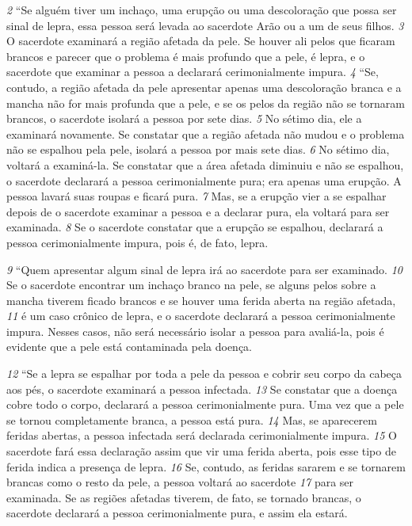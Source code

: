 \smallskip
\textit{\tiny 2} 
“Se alguém tiver um inchaço, uma
erupção ou uma descoloração que possa ser sinal de lepra,
 essa pessoa será
levada ao sacerdote Arão ou a um de seus filhos. 
\textit{\tiny 3} 
O sacerdote examinará a região
afetada da pele. Se houver ali pelos que ficaram brancos e parecer que o
problema é mais profundo que a pele, é lepra, e o sacerdote que examinar a
pessoa a declarará cerimonialmente impura. 
\textit{\tiny 4} 
“Se, contudo, a região afetada da pele apresentar apenas uma descoloração
branca e a mancha não for mais profunda que a pele, e se os pelos da região não
se tornaram brancos, o sacerdote isolará a pessoa por sete dias. 
\textit{\tiny 5} 
No sétimo dia,
ele a examinará novamente. Se constatar que a região afetada não mudou e o
problema não se espalhou pela pele, isolará a pessoa por mais sete dias. 
\textit{\tiny 6} 
No sétimo dia, voltará a examiná-la. Se constatar que a área afetada diminuiu e não se
espalhou, o sacerdote declarará a pessoa cerimonialmente pura; era apenas uma
erupção. A pessoa lavará suas roupas e ficará pura. 
\textit{\tiny 7} 
Mas, se a erupção vier a se
espalhar depois de o sacerdote examinar a pessoa e a declarar pura, ela voltará
para ser examinada. 
\textit{\tiny 8} 
Se o sacerdote constatar que a erupção se espalhou,
declarará a pessoa cerimonialmente impura, pois é, de fato, lepra. 

\bigskip 
\textit{\tiny 9} 
“Quem apresentar algum sinal de lepra irá ao sacerdote para ser examinado.
\textit{\tiny 10}
Se o sacerdote encontrar um inchaço branco na pele, se alguns pelos sobre a
mancha tiverem ficado brancos e se houver uma ferida aberta na região afetada,
\textit{\tiny 11}
é um caso crônico de lepra, e o sacerdote declarará a pessoa cerimonialmente
impura. Nesses casos, não será necessário isolar a pessoa para avaliá-la, pois é
evidente que a pele está contaminada pela doença.

\smallskip
\textit{\tiny 12}
“Se a lepra se espalhar por toda a pele da pessoa e cobrir seu corpo da cabeça
aos pés, o sacerdote examinará a pessoa infectada. 
\textit{\tiny 13}
Se constatar que a doença
cobre todo o corpo, declarará a pessoa cerimonialmente pura. Uma vez que a pele
se tornou completamente branca, a pessoa está pura. 
\textit{\tiny 14}
Mas, se aparecerem
feridas abertas, a pessoa infectada será declarada cerimonialmente impura. 
\textit{\tiny 15}
O
sacerdote fará essa declaração assim que vir uma ferida aberta, pois esse tipo de
ferida indica a presença de lepra. 
\textit{\tiny 16}
Se, contudo, as feridas sararem e se tornarem
brancas como o resto da pele, a pessoa voltará ao sacerdote 
\textit{\tiny 17}
para ser examinada.
Se as regiões afetadas tiverem, de fato, se tornado brancas, o sacerdote declarará a
pessoa cerimonialmente pura, e assim ela estará.
   

